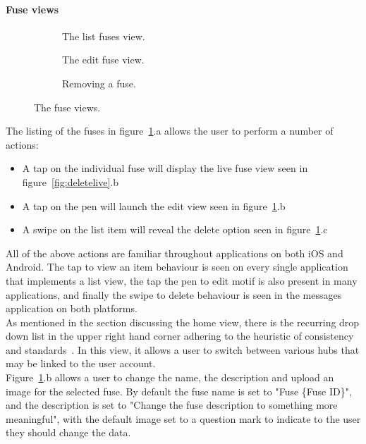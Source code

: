 \documentclass[preprint,12pt,3p]{elsarticle}
\begin{document}
\paragraph{Fuse views}
\begin{figure}[H]
    \centering
    \begin{subfigure}[t]{0.32\columnwidth}
        \centering
        \caption{The list fuses view.}
    \end{subfigure}
    \begin{subfigure}[t]{0.32\columnwidth}
        \centering
        \caption{The edit fuse view.}
    \end{subfigure}
    \begin{subfigure}[t]{0.32\columnwidth}
        \centering
        \caption{Removing a fuse.}
    \end{subfigure}
    \caption{The fuse views.}
    \label{fig:fuseviews}
\end{figure}
The listing of the fuses in figure~\ref{fig:fuseviews}.a allows the user to perform a number of actions:
\begin{itemize}
\item A tap on the individual fuse will display the live fuse view seen in figure~\ref{fig:deletelive}.b
\item A tap on the pen will launch the edit view seen in figure~\ref{fig:fuseviews}.b
\item A swipe on the list item will reveal the delete option seen in figure~\ref{fig:fuseviews}.c
\end{itemize}
All of the above actions are familiar throughout applications on both iOS and Android. The tap to view an item behaviour is seen on every single application that implements a list view, the tap the pen to edit motif is also present in many applications, and finally the swipe to delete behaviour is seen in the messages application on both platforms.\\
As mentioned in the section discussing the home view, there is the recurring drop down list in the upper right hand corner adhering to the heuristic of consistency and standards~\cite{nielsen}. In this view, it allows a user to switch between various hubs that may be linked to the user account.\\
Figure~\ref{fig:fuseviews}.b allows a user to change the name, the description and upload an image for the selected fuse. By default the fuse name is set to "Fuse \{Fuse ID\}", and the description is set to "Change the fuse description to something more meaningful", with the default image set to a question mark to indicate to the user they should change the data.\\
\end{document}
